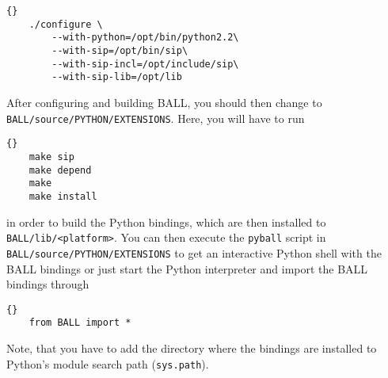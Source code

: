 \begin{lstlisting}{}
	./configure \
		--with-python=/opt/bin/python2.2\
		--with-sip=/opt/bin/sip\
		--with-sip-incl=/opt/include/sip\
		--with-sip-lib=/opt/lib
\end{lstlisting}

\noindent
After configuring and building BALL, you should then change to {\tt
BALL/source/PYTHON/EXTENSIONS}. Here, you will have to run

\begin{lstlisting}{}
	make sip
	make depend
	make
	make install
\end{lstlisting}

\noindent
in order to build the Python bindings, which are then installed to {\tt
BALL/lib/<platform>}. 
You can then execute the {\tt pyball} script in {\tt
BALL/source/PYTHON/EXTENSIONS} to get an interactive Python shell with the
BALL bindings or just start the Python interpreter and import the BALL
bindings through

\begin{lstlisting}{}
	from BALL import *
\end{lstlisting}

\noindent
Note, that you have to add the directory where the bindings are installed to
Python's module search path ({\tt sys.path}).
